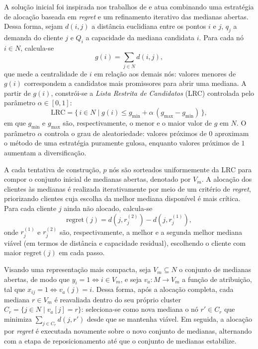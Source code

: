 \documentclass[a4paper,11pt]{article}
\begin{document}
A solução inicial foi inspirada nos trabalhos de \cite{stefanello2015matheuristics, resende2002grasp, freitas2025ils_pmediana}  e atua combinando uma estratégia de alocação baseada em \textit{regret} e um refinamento iterativo das medianas abertas. Dessa forma, sejam $d(i,j)$ a distância euclidiana entre os pontos $i$ e $j$, $q_j$ a demanda do cliente $j$ e $Q_i$ a capacidade da mediana candidata $i$. Para cada nó $i \in N$, calcula-se 
\begin{equation}
g(i) = \sum_{j \in N} d(i,j),
\label{eq:rank_grasp}
\end{equation}
que mede a centralidade de $i$ em relação aos demais nós: valores menores de $g(i)$ correspondem a candidatos mais promissores para abrir uma mediana. A partir de $g(i)$, constrói-se a \textit{Lista Restrita de Candidatos} (LRC) controlada pelo parâmetro $\alpha \in [0,1]$:
\begin{equation}
\mathrm{LRC} = \{\, i \in N \mid g(i) \leq g_{\min} + \alpha\,(g_{\max} - g_{\min})\,\},
\label{eq:lrc}
\end{equation}
em que $g_{\min}$ e $g_{\max}$ são, respectivamente, o menor e o maior valor de $g$ em $N$. O parâmetro $\alpha$ controla o grau de aleatoriedade: valores próximos de $0$ aproximam o método de uma estratégia puramente gulosa, enquanto valores próximos de $1$ aumentam a diversificação.

A cada tentativa de construção, $p$ nós são sorteados uniformemente da LRC para compor o conjunto inicial de medianas abertas, denotado por $V_m$. A alocação dos clientes às medianas é realizada iterativamente por meio de um critério de \textit{regret}, priorizando clientes cuja escolha da melhor mediana disponível é mais crítica. Para cada cliente $j$ ainda não alocado, calcula-se
\begin{equation}
\mathrm{regret}(j) = d(j, r^{(2)}_j) - d(j, r^{(1)}_j),
\label{eq:regret}
\end{equation}
onde $r^{(1)}_j$ e $r^{(2)}_j$ são, respectivamente, a melhor e a segunda melhor mediana viável (em termos de distância e capacidade residual), escolhendo o cliente com maior $\mathrm{regret}(j)$ em cada passo. 


Visando uma representação mais compacta, seja  $V_m \subseteq N$ o conjunto de medianas abertas, de modo que $y_i = 1 \iff i \in V_m$, e seja $v_a : M \to V_m$ a função de atribuição, tal que $x_{ij} = 1 \iff v_a(j) = i$. Dessa forma, após a alocação completa, cada mediana $r \in V_m$ é reavaliada dentro do seu próprio cluster $C_r = \{ j \in N \mid v_a[j] = r \}$: seleciona-se como nova mediana o nó $r' \in C_r$ que minimiza $\sum_{j \in C_r} d(j, r')$ desde que se mantenha viável. Em seguida, a alocação por \textit{regret} é executada novamente sobre o novo conjunto de medianas, alternando com a etapa de reposicionamento até que o conjunto de medianas estabilize. 
\end{document}
